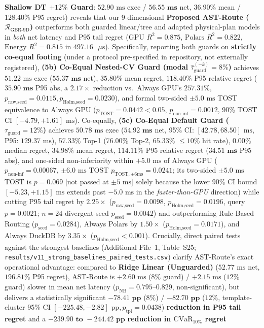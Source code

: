 \documentclass[10pt,a4paper]{article}
\begin{document}
\begin{enumerate}[leftmargin=1.5em,itemsep=0.8pt]
\textbf{Shallow DT $+12\%$ Guard}: $52.90\text{ ms}$ exec / $\mathbf{56.55\text{ ms}}$ net, $36.90\%$ mean / $128.40\%$ P95 regret) reveals that our 9-dimensional \textbf{Proposed AST-Route ($\mathcal{R}_{\text{GBR-9D}}$)} outperforms both guarded linear/tree and adapted physical-plan models in \emph{both} net latency and P95 tail regret ($\text{GPU } R^2 = \mathbf{0.875}$, $\text{Polars } R^2 = \mathbf{0.822}$, $\text{Energy } R^2 = \mathbf{0.815}$ in $497.16\text{ }\mu\text{s}$). Specifically, reporting both guards on \textbf{strictly co-equal footing} (under a protocol pre-specified in repository, not externally registered), \textbf{(5b) Co-Equal Nested-CV Guard (modal $\hat{\tau}_{\text{guard}}^{(-k)}=8\%$)} achieves $51.22\text{ ms}$ exec ($\mathbf{55.37\text{ ms}}$ net), $35.80\%$ mean regret, $\mathbf{118.40\%}$ P95 relative regret ($\mathbf{35.90\text{ ms}}$ P95 abs, a $\mathbf{2.17\times}$ reduction vs.\ Always GPU's $257.31\%$, $p_{\text{raw,seed}}=\mathbf{0.0115}, p_{\text{Holm,seed}}=\mathbf{0.0230}$), and formal two-sided $\pm 5.0\text{ ms}$ TOST equivalence to Always GPU ($p_{\text{TOST}}=\mathbf{0.0442} < 0.05$, $p_{\text{non-inf}}=0.0012$, 90\% TOST CI $[-4.79, +1.61]\text{ ms}$). Co-equally, \textbf{(5c) Co-Equal Default Guard ($\tau_{\text{guard}}=12\%$)} achieves $50.78\text{ ms}$ exec ($\mathbf{54.92\text{ ms}}$ net, 95\% CI: $[42.78, 68.50]\text{ ms}$, P95: $129.37\text{ ms}$), $\mathbf{57.33\%}$ Top-1 ($\mathbf{76.00\%}$ Top-2, $\mathbf{65.33\%}$ $\le 10\%$ hit rate), $\mathbf{0.00\%}$ median regret, $\mathbf{34.98\%}$ mean regret, $\mathbf{114.11\%}$ P95 relative regret ($\mathbf{34.51\text{ ms}}$ P95 abs), and one-sided non-inferiority within $+5.0\text{ ms}$ of Always GPU ($p_{\text{non-inf}}=\mathbf{0.00067}$, $\pm 6.0\text{ ms}$ TOST $p_{\text{TOST},\pm 6\text{ms}}=0.0241$; its two-sided $\pm 5.0\text{ ms}$ TOST is $p=0.069$ [not passed at $\pm 5\text{ ms}$] solely because the lower 90\% CI bound $[-5.23, +1.15]\text{ ms}$ extends past $-5.0\text{ ms}$ in the \emph{faster-than-GPU} direction) while cutting P95 tail regret by $\mathbf{2.25\times}$ ($p_{\text{raw,seed}}=\mathbf{0.0098}$, $p_{\text{Holm,seed}}=\mathbf{0.0196}$, query $p=\mathbf{0.0021}$; $n=24$ divergent-seed $p_{\text{seed}}=\mathbf{0.0042}$) and outperforming Rule-Based Routing ($p_{\text{seed}}=0.0284$), Always Polars by $\mathbf{1.50\times}$ ($p_{\text{Holm,seed}}=0.0171$), and Always DuckDB by $\mathbf{3.35\times}$ ($p_{\text{Holm,seed}} < 0.001$). Crucially, direct paired tests against the strongest baselines (Additional File~1, Table~S25; \texttt{results/v11\_strong\_baselines\_paired\_tests.csv}) clarify AST-Route's exact operational advantage: compared to \textbf{Ridge Linear (Unguarded)} ($52.77\text{ ms}$ net, $196.81\%$ P95 regret), AST-Route is $+2.60\text{ ms}$ ($8\%$ guard) / $+2.15\text{ ms}$ ($12\%$ guard) slower in mean net latency ($p_{\text{NB}}=0.795\text{--}0.829$, non-significant), but delivers a statistically significant $\mathbf{-78.41\text{ pp}}$ ($8\%$) / $\mathbf{-82.70\text{ pp}}$ ($12\%$, template-cluster 95\% CI $[-225.48,-2.82]\text{ pp}, p_{\text{tpl}}=0.0438$) \textbf{reduction in P95 tail regret} and a $\mathbf{-239.90\text{ to }-244.42\text{ pp}}$ \textbf{reduction in $\text{CVaR}_{10\%}$ regret} 
\end{enumerate}
\end{document}
